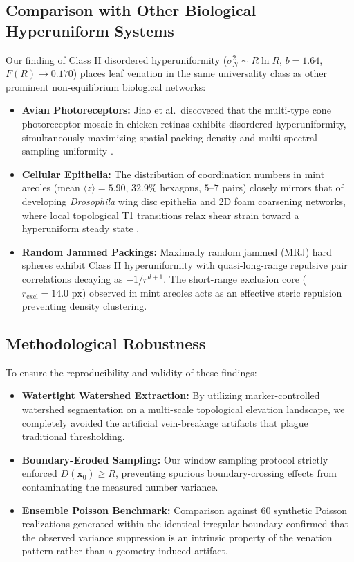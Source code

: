\documentclass[10pt,twocolumn]{article}
\begin{document}
\subsection{Comparison with Other Biological Hyperuniform Systems}
Our finding of Class II disordered hyperuniformity ($\sigma_N^2 \sim R \ln R$, $b = 1.64$, $F(R) \to 0.170$) places leaf venation in the same universality class as other prominent non-equilibrium biological networks:
\begin{itemize}
    \item \textbf{Avian Photoreceptors:} Jiao et al.\ discovered that the multi-type cone photoreceptor mosaic in chicken retinas exhibits disordered hyperuniformity, simultaneously maximizing spatial packing density and multi-spectral sampling uniformity \cite{jiao2014avian}.
    \item \textbf{Cellular Epithelia:} The distribution of coordination numbers in mint areoles (mean $\langle z \rangle = 5.90$, $32.9\%$ hexagons, $5$--$7$ pairs) closely mirrors that of developing \textit{Drosophila} wing disc epithelia and 2D foam coarsening networks, where local topological T1 transitions relax shear strain toward a hyperuniform steady state \cite{corson2009turning}.
    \item \textbf{Random Jammed Packings:} Maximally random jammed (MRJ) hard spheres exhibit Class II hyperuniformity with quasi-long-range repulsive pair correlations decaying as $-1/r^{d+1}$. The short-range exclusion core ($r_{\mathrm{excl}} = 14.0\text{ px}$) observed in mint areoles acts as an effective steric repulsion preventing density clustering.
\end{itemize}

\subsection{Methodological Robustness}
To ensure the reproducibility and validity of these findings:
\begin{itemize}
    \item \textbf{Watertight Watershed Extraction:} By utilizing marker-controlled watershed segmentation on a multi-scale topological elevation landscape, we completely avoided the artificial vein-breakage artifacts that plague traditional thresholding.
    \item \textbf{Boundary-Eroded Sampling:} Our window sampling protocol strictly enforced $D(\mathbf{x}_0) \ge R$, preventing spurious boundary-crossing effects from contaminating the measured number variance.
    \item \textbf{Ensemble Poisson Benchmark:} Comparison against $60$ synthetic Poisson realizations generated within the identical irregular boundary confirmed that the observed variance suppression is an intrinsic property of the venation pattern rather than a geometry-induced artifact.
\end{itemize}
\end{document}
